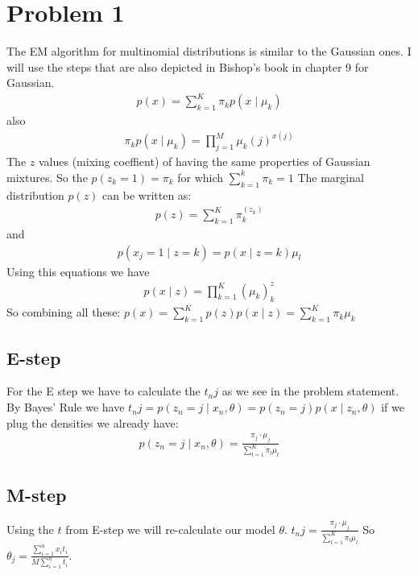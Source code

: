 \section*{Problem 1}
The EM algorithm for multinomial distributions is similar to the Gaussian ones.
I will use the steps that are also depicted in Bishop's book in chapter 9 for
Gaussian.
\begin{align*}
p(x) = \sum_{k=1}^K \pi_k p(x \mid \mu_k)
\end{align*}
also
\begin{align*}
\pi_k p(x \mid \mu_k) = \prod_{j=1}^M \mu_k (j)^{x(j)}
\end{align*}
The $z$ values (mixing coeffient) of having the same properties of Gaussian mixtures.
So the $p( z_k = 1) = \pi_k$ for which $\sum_{k=1}^k \pi_k = 1$
The marginal distribution $p(z)$ can be written as:
\begin{align*}
p(z) = \sum_{k=1}^K \pi_{k}^(z_k)
\end{align*}
and
\begin{align*}
p(x_j =1 \mid z=k) = p(x\mid z=k) \mu_l
\end{align*}
Using this equations we have 
\begin{align*}
p(x\mid z) = \prod_{k=1}^K (\mu_{k})^ z_{k}
\end{align*}
So combining all these:
$p(x) = \sum_{k=1}^K p(z)p(x\mid z) = \sum_{k=1}^K \pi_k \mu_k$
\subsection*{E-step}
For the E step we have to calculate the $t_nj$ as we see in the problem statement.
By Bayes' Rule we have
$t_nj=p(z_n =j \mid x_n,\theta) = p(z_n =j)p(x\mid z_n,\theta)$
if we plug the densities we already have:
\begin{align*}
p(z_n =j \mid x_n,\theta) = \frac{\pi_j \cdot \mu_j}{\sum_{l=1}^K \pi_l \mu_l}
\end{align*}
\subsection*{M-step}
Using the $t$ from E-step we will re-calculate our model $\theta$.
$t_nj=\frac{\pi_j \cdot \mu_j}{\sum_{l=1}^K \pi_l \mu_l}$
So $\theta_j = \frac{\sum_{i=1}^n x_{i} t_i}{M\sum_{i=1}^n t_{i}}$.


